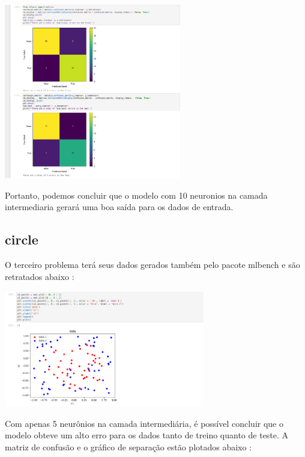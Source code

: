 \documentclass{article}
\begin{document}
\begin{center}

\includegraphics[height=3in]{exercise_pic/xor/conf_matrix_30_xor.png}
\vspace{10pt} 

Portanto, podemos concluir que o modelo com 10 neuronios na camada intermediaria gerará uma boa saída para os dados de entrada.

\end{center}






\subsection{circle}


O terceiro problema terá seus dados gerados também pelo pacote mlbench e são retratados abaixo : 

\begin{center}

\includegraphics[height=2in]{exercise_pic/circle/data_circle.png}

\end{center}
\vspace{5pt}
Com apenas 5 neurônios na camada intermediária, é possível concluir que o modelo obteve um alto erro para os dados tanto de treino quanto de teste. A matriz de confusão e o gráfico de separação estão plotados abaixo :
\end{document}
